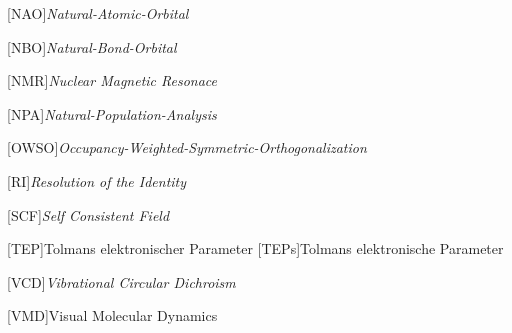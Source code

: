 \begin{acronym}[SEPSEP]
    [NAO]{\textit{Natural-Atomic-Orbital}}

    [NBO]{\textit{Natural-Bond-Orbital}}
    
    [NMR]{\textit{Nuclear Magnetic Resonace}}
        
    [NPA]{\textit{Natural-Population-Analysis}}
    
    [OWSO]{\textit{Occupancy-Weighted-Symmetric-Orthogonalization}}
    
    [RI]{\textit{Resolution of the Identity}}
    
	[SCF]{\textit{Self Consistent Field}}   

	[TEP]{Tolmans elektronischer Parameter}   
		{Tolmans elektronische Parameter}
		
	[VCD]{\textit{Vibrational Circular Dichroism}}

    

        
    [VMD]{Visual Molecular Dynamics}
\end{acronym}